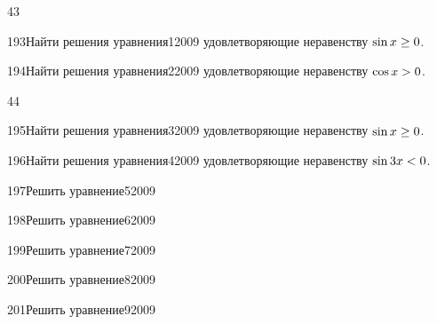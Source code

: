 \begin{TrigSourcePage}{43}
\begin{TrigExercise}{193}{Найти решения уравнения}{1}{2009}
удовлетворяющие неравенству $\sin x\geq0$.
\end{TrigExercise}
\begin{TrigExercise}{194}{Найти решения уравнения}{2}{2009}
удовлетворяющие неравенству $\cos x>0$.
\end{TrigExercise}
\end{TrigSourcePage}

\begin{TrigSourcePage}{44}
\begin{TrigExercise}{195}{Найти решения уравнения}{3}{2009}
удовлетворяющие неравенству $\sin x\geq0$.
\end{TrigExercise}
\begin{TrigExercise}{196}{Найти решения уравнения}{4}{2009}
удовлетворяющие неравенству $\sin 3x<0$.
\end{TrigExercise}
\begin{TrigExercise}{197}{Решить уравнение}{5}{2009}
\end{TrigExercise}
\begin{TrigExercise}{198}{Решить уравнение}{6}{2009}
\end{TrigExercise}
\begin{TrigExercise}{199}{Решить уравнение}{7}{2009}
\end{TrigExercise}
\begin{TrigExercise}{200}{Решить уравнение}{8}{2009}
\end{TrigExercise}
\begin{TrigExercise}{201}{Решить уравнение}{9}{2009}

\end{TrigExercise}
\end{TrigSourcePage}
